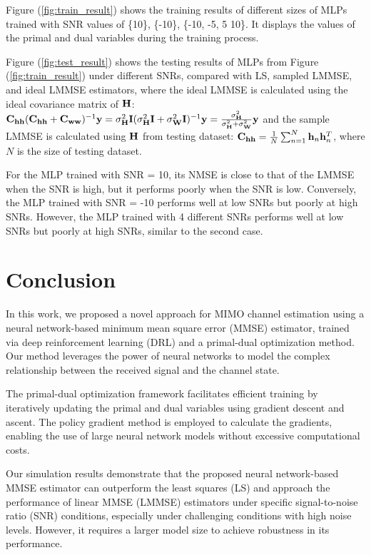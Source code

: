 \documentclass[journal,10pt,twocolumn]{IEEEtran}
\begin{document}
        Figure (\ref{fig:train_result}) shows the training results of different sizes of MLPs trained with SNR values of \{10\}, \{-10\}, \{-10, -5, 5 10\}. 
        It displays the values of the primal and dual variables during the training process.

        Figure (\ref{fig:test_result}) shows the testing results of MLPs from Figure (\ref{fig:train_result}) under different SNRs, 
        compared with LS, sampled LMMSE, and ideal LMMSE estimators, where the ideal LMMSE is calculated using the ideal covariance matrix of ${\bf H}$: 
        ${\bf C}_{{\bf h}{\bf h}}({\bf C}_{{\bf h}{\bf h}}+{\bf C}_{{\bf w}{\bf w}})^{-1}{\bf y} = \sigma_{{\bf H}}^2{\bf I}(\sigma_{{\bf H}}^2{\bf I} + \sigma_{{\bf W}}^2{\bf I})^{-1}{\bf y} = \frac{\sigma_{{\bf H}}^2}{\sigma_{{\bf H}}^2+\sigma_{{\bf W}}^2}{\bf y}$
        and the sample LMMSE is calculated using ${\bf H}$ from testing dataset: ${\bf C}_{{\bf h}{\bf h}} = \frac{1}{N}\sum_{n=1}^{N}{\bf h}_n{\bf h}_n^T$, where $N$ is the size of testing dataset.

        For the MLP trained with SNR = 10, its NMSE is close to that of the LMMSE when the SNR is high, but it performs poorly when the SNR is low. 
        Conversely, the MLP trained with SNR = -10 performs well at low SNRs but poorly at high SNRs.
        However, the MLP trained with 4 different SNRs performs well at low SNRs but poorly at high SNRs, similar to the second case.

    \section{Conclusion}
        In this work, we proposed a novel approach for MIMO channel estimation using a neural network-based minimum mean square error (MMSE) estimator, 
        trained via deep reinforcement learning (DRL) and a primal-dual optimization method. Our method leverages the power of neural networks to model 
        the complex relationship between the received signal and the channel state.

        The primal-dual optimization framework facilitates efficient training by iteratively updating the primal and dual variables using gradient descent and ascent. 
        The policy gradient method is employed to calculate the gradients, enabling the use of large neural network models without excessive computational costs.
        
        Our simulation results demonstrate that the proposed neural network-based MMSE estimator can outperform the least squares (LS) and approach the performance of 
        linear MMSE (LMMSE) estimators under specific signal-to-noise ratio (SNR) conditions, especially under challenging conditions with high noise levels. 
        However, it requires a larger model size to achieve robustness in its performance.
        
\end{document}

